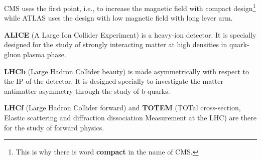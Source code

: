 CMS uses the first point, i.e., to increase the magnetic field with compact design\footnote{This is why there is word {\textbf{compact}} in the name of CMS.} while ATLAS uses the design with low magnetic field with long lever arm.


{\textbf{ALICE}} (A Large Ion Collider Experiment) is a heavy-ion detector. It is specially designed for the study of strongly interacting matter at high densities in quark-gluon plasma phase.

{\textbf{LHCb}} (Large Hadron Collider beauty) is made asymmetrically with respect to the IP of the detector. It is designed specially to investigate the matter-antimatter asymmetry through the study of b-quarks.

{\textbf{LHCf}} (Large Hadron Collider forward) and {\textbf{TOTEM}} (TOTal cross-section, Elastic scattering and diffraction dissociation Measurement at the LHC) are there for the study of forward physics.

